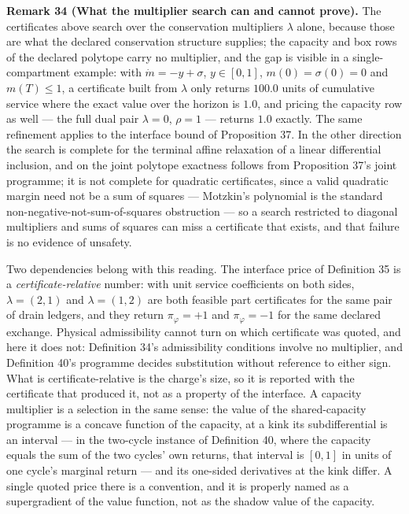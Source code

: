 \documentclass[11pt]{article}
\begin{document}
\textbf{Remark 34 (What the multiplier search can and cannot prove).} The certificates above search over the conservation multipliers \(\lambda\) alone, because those are what the declared conservation structure supplies; the capacity and box rows of the declared polytope carry no multiplier, and the gap is visible in a single-compartment example: with \(\dot m = -y + \sigma\), \(y \in [0, 1]\), \(m(0) = \sigma(0) = 0\) and \(m(T) \le 1\), a certificate built from \(\lambda\) only returns \(100.0\) units of cumulative service where the exact value over the horizon is \(1.0\), and pricing the capacity row as well --- the full dual pair \(\lambda = 0\), \(\rho = 1\) --- returns \(1.0\) exactly. The same refinement applies to the interface bound of Proposition 37. In the other direction the search is complete for the terminal affine relaxation of a linear differential inclusion, and on the joint polytope exactness follows from Proposition 37's joint programme; it is not complete for quadratic certificates, since a valid quadratic margin need not be a sum of squares --- Motzkin's polynomial is the standard non-negative-not-sum-of-squares obstruction --- so a search restricted to diagonal multipliers and sums of squares can miss a certificate that exists, and that failure is no evidence of unsafety.

Two dependencies belong with this reading. The interface price of Definition 35 is a \emph{certificate-relative} number: with unit service coefficients on both sides, \(\lambda = (2,1)\) and \(\lambda = (1,2)\) are both feasible part certificates for the same pair of drain ledgers, and they return \(\pi_\varphi = +1\) and \(\pi_\varphi = -1\) for the same declared exchange. Physical admissibility cannot turn on which certificate was quoted, and here it does not: Definition 34's admissibility conditions involve no multiplier, and Definition 40's programme decides substitution without reference to either sign. What is certificate-relative is the charge's size, so it is reported with the certificate that produced it, not as a property of the interface. A capacity multiplier is a selection in the same sense: the value of the shared-capacity programme is a concave function of the capacity, at a kink its subdifferential is an interval --- in the two-cycle instance of Definition 40, where the capacity equals the sum of the two cycles' own returns, that interval is \([0, 1]\) in units of one cycle's marginal return --- and its one-sided derivatives at the kink differ. A single quoted price there is a convention, and it is properly named as a supergradient of the value function, not as the shadow value of the capacity.
\end{document}
